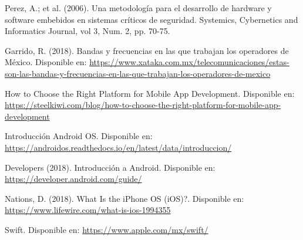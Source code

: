 \begin{thebibliography}{0}
	 Perez, A.; et al. (2006). Una metodología para el desarrollo de hardware y software embebidos en sistemas críticos de seguridad. Systemics, Cybernetics and Informatics Journal, vol 3, Num. 2, pp. 70-75.

	 Garrido, R. (2018). Bandas y frecuencias en las que trabajan los operadores de México. Disponible en: \url{https://www.xataka.com.mx/telecomunicaciones/estas-son-las-bandas-y-frecuencias-en-las-que-trabajan-los-operadores-de-mexico}
	
	 How to Choose the Right Platform for Mobile App Development. Disponible en: \url{https://steelkiwi.com/blog/how-to-choose-the-right-platform-for-mobile-app-development}
	
	 Introducción Android OS. Disponible en: \url{https://androidos.readthedocs.io/en/latest/data/introduccion/}
	
	 Developers (2018). Introducción a Android. Disponible en: \url{https://developer.android.com/guide/}
	
	 Nations, D. (2018). What Is the iPhone OS (iOS)?. Disponible en: \url{https://www.lifewire.com/what-is-ios-1994355}
	
	 Swift. Disponible en: \url{https://www.apple.com/mx/swift/}
	
	
	
\end{thebibliography}